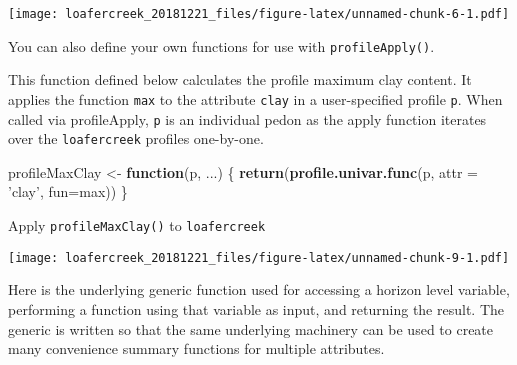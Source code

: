 \documentclass[]{article}
\newenvironment{Shaded}{\begin{snugshade}}{\end{snugshade}}
\newcommand{\KeywordTok}[1]{\textcolor[rgb]{0.13,0.29,0.53}{\textbf{#1}}}
\newcommand{\DataTypeTok}[1]{\textcolor[rgb]{0.13,0.29,0.53}{#1}}
\newcommand{\StringTok}[1]{\textcolor[rgb]{0.31,0.60,0.02}{#1}}
\newcommand{\CommentTok}[1]{\textcolor[rgb]{0.56,0.35,0.01}{\textit{#1}}}
\newcommand{\ControlFlowTok}[1]{\textcolor[rgb]{0.13,0.29,0.53}{\textbf{#1}}}
\newcommand{\OperatorTok}[1]{\textcolor[rgb]{0.81,0.36,0.00}{\textbf{#1}}}
\newcommand{\NormalTok}[1]{#1}
\begin{document}
\texttt{[image: loafercreek\_20181221\_files/figure-latex/unnamed-chunk-6-1.pdf]}

\begin{Shaded}
\end{Shaded}

You can also define your own functions for use with
\texttt{profileApply()}.

This function defined below calculates the profile maximum clay content.
It applies the function \texttt{max} to the attribute \texttt{clay} in a
user-specified profile \texttt{p}. When called via profileApply,
\texttt{p} is an individual pedon as the apply function iterates over
the \texttt{loafercreek} profiles one-by-one.

\begin{Shaded}
\begin{Highlighting}[]
\NormalTok{profileMaxClay <-}\StringTok{ }\ControlFlowTok{function}\NormalTok{(p, ...) \{}
  \KeywordTok{return}\NormalTok{(}\KeywordTok{profile.univar.func}\NormalTok{(p, }\DataTypeTok{attr =} \StringTok{'clay'}\NormalTok{, }\DataTypeTok{fun=}\NormalTok{max))}
\NormalTok{\}}
\end{Highlighting}
\end{Shaded}

Apply \texttt{profileMaxClay()} to \texttt{loafercreek}

\begin{Shaded}
\end{Shaded}

\texttt{[image: loafercreek\_20181221\_files/figure-latex/unnamed-chunk-9-1.pdf]}

Here is the underlying generic function used for accessing a horizon
level variable, performing a function using that variable as input, and
returning the result. The generic is written so that the same underlying
machinery can be used to create many convenience summary functions for
multiple attributes.
\end{document}
